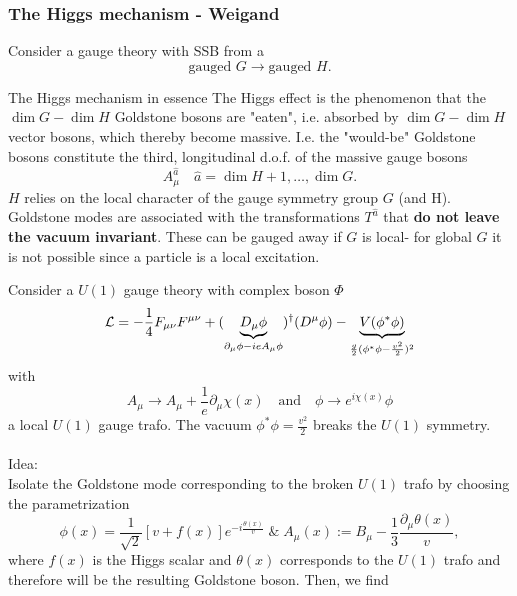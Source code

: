 \subsubsection{The Higgs mechanism - Weigand}
\label{subsubsec:higgsWeigand}
Consider a gauge theory with SSB from a
\begin{equation}
	\text{gauged } G \longrightarrow \text{gauged }H.
\end{equation}
\begin{mybox}{The Higgs mechanism in essence}
The Higgs effect is the phenomenon that the $\dim G -\dim H$ Goldstone bosons are "eaten", i.e. absorbed by $\dim G-\dim H$ vector bosons, which thereby become massive. I.e. the "would-be" Goldstone bosons constitute the third, longitudinal d.o.f. of the massive gauge bosons
\begin{equation*}
	A^{\hat{a}}_\mu \quad \hat{a}=\dim H+1,\dots,\dim G.
\end{equation*}
$H$ relies on the local character of the gauge symmetry group $G$ (and H). Goldstone modes are associated with the transformations $T^{\hat{a}}$ that \textbf{do not leave the vacuum invariant}. These can be gauged away if $G$ is local- for global $G$ it is not possible since a particle is a local excitation.
\end{mybox}
Consider a $U(1)$ gauge theory with complex boson $\Phi$ 
\begin{equation*}
	\mathcal{L} = - \frac{1}{4} F_{\mu \nu} F^{\mu \nu} + (\underbrace{D_\mu \phi}_{\partial_\mu \phi -i e A_\mu \phi})^\dagger (D^\mu \phi) - \underbrace{V(\phi^*  \phi)}_{\frac{g}{2} (\phi^* \phi- \frac{v^2}{2})^2}
\end{equation*}
with
\begin{equation}
A_\mu \rightarrow A_\mu + \frac{1}{e} \partial_\mu \chi(x) \quad \text{and} \quad \phi\rightarrow e^{i\chi(x)} \phi
\end{equation}
a local $U(1)$ gauge trafo. The vacuum $\phi^* \phi = \frac{v^2}{2}$ breaks the $U(1)$ symmetry.\\
\\
Idea:
\\
Isolate the Goldstone mode corresponding to the broken $U(1)$ trafo by choosing the parametrization
\begin{equation}
	\label{eq:higgsparametrization}
	\phi(x)= \frac{1}{\sqrt{2} } \left[v+f(x)\right] e^{-i \frac{\theta(x)}{v}} \; \& \; A_\mu(x) := B_\mu - \frac{1}{3} \frac{\partial_\mu \theta(x)}{v},
\end{equation}
where $f(x)$ is the Higgs scalar and $\theta(x)$ corresponds to the $U(1)$ trafo and therefore will be the resulting Goldstone boson. Then, we find
